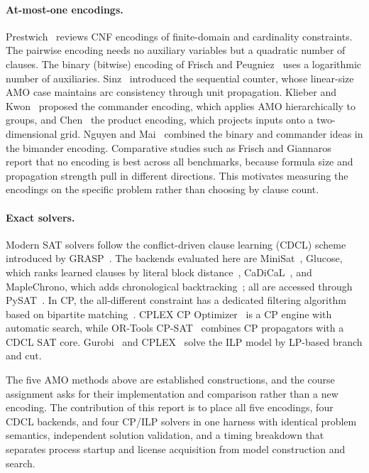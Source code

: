 \paragraph{At-most-one encodings.} Prestwich~\cite{prestwich} reviews CNF
encodings of finite-domain and cardinality constraints. The pairwise
encoding needs no auxiliary variables but a quadratic number of clauses.
The binary (bitwise) encoding of Frisch and Peugniez~\cite{frischbinary}
uses a logarithmic number of auxiliaries. Sinz~\cite{sinz} introduced the
sequential counter, whose linear-size AMO case maintains arc consistency
through unit propagation. Klieber and Kwon~\cite{commander} proposed the
commander encoding, which applies AMO hierarchically to groups, and
Chen~\cite{product} the product encoding, which projects inputs onto a
two-dimensional grid. Nguyen and Mai~\cite{nguyenmai} combined the
binary and commander ideas in the bimander encoding. Comparative studies
such as Frisch and Giannaros~\cite{frischamok} report that no encoding is
best across all benchmarks, because formula size and propagation strength
pull in different directions. This motivates measuring the encodings on
the specific problem rather than choosing by clause count.

\paragraph{Exact solvers.} Modern SAT solvers follow the conflict-driven
clause learning (CDCL) scheme introduced by GRASP~\cite{grasp}. The
backends evaluated here are MiniSat~\cite{minisat}, Glucose, which ranks
learned clauses by literal block distance~\cite{glucose},
CaDiCaL~\cite{cadical}, and MapleChrono, which adds chronological
backtracking~\cite{chrono}; all are accessed through PySAT~\cite{pysat}.
In CP, the all-different constraint has a dedicated filtering algorithm
based on bipartite matching~\cite{regin}. CPLEX CP
Optimizer~\cite{cpoptimizer} is a CP engine with automatic search, while
OR-Tools CP-SAT~\cite{cpsat} combines CP propagators with a CDCL SAT core.
Gurobi~\cite{gurobi} and CPLEX~\cite{cplex} solve the ILP model by
LP-based branch and cut.

The five AMO methods above are established constructions, and the course
assignment asks for their implementation and comparison rather than a new
encoding. The contribution of this report is to place all five encodings,
four CDCL backends, and four CP/ILP solvers in one harness with identical
problem semantics, independent solution validation, and a timing breakdown
that separates process startup and license acquisition from model
construction and search.
